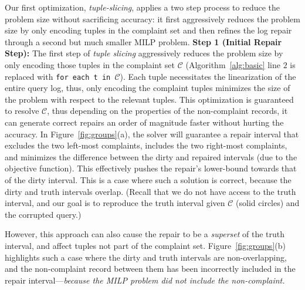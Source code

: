 Our first optimization, \emph{tuple-slicing}, applies a two step process to reduce the 
problem size without sacrificing accuracy: it
first aggressively reduces
the problem size by only encoding tuples in the complaint set and then refines the log repair 
through a second but much smaller MILP problem. 
\noindent\textbf{Step 1 (Initial Repair Step):} 
The first step of  \emph{tuple slicing} 
aggressively reduces the problem size by only encoding those 
tuples in the complaint set $\mathcal{C}$ (Algorithm~\ref{alg:basic} line $2$
is replaced with \texttt{for each t in $\mathcal{C}$}). 
Each tuple necessitates
the linearization of the entire query log, thus, only encoding the complaint tuples minimizes the 
size of the problem with respect to the relevant tuples. 
This optimization is guaranteed to resolve $\mathcal{C}$, thus depending on the properties of the non-complaint records, it can generate correct repairs
an order of magnitude faster without hurting the accuracy. 
In Figure~\ref{fig:groups}(a),
the solver will guarantee a repair interval that excludes the two left-most complaints, includes the two right-most complaints,
and minimizes the difference between the dirty and repaired intervals (due to the objective function).
This effectively pushes the repair's lower-bound towards that of the dirty interval.
This is a case where such a solution is correct, because the dirty and truth intervals overlap.
(Recall that we do not have access to the truth interval, and our goal is to reproduce the truth interval given $\mathcal{C}$ (solid circles) and the corrupted query.) 

However, this approach can also cause the repair to be a {\it superset} of the truth interval, and affect tuples not part of the complaint set.
Figure~\ref{fig:groups}(b) highlights such a case where the dirty and truth intervals are non-overlapping, and the non-complaint record between them has been incorrectly included in the repair interval---{\it because the MILP problem did not include the non-complaint.}


